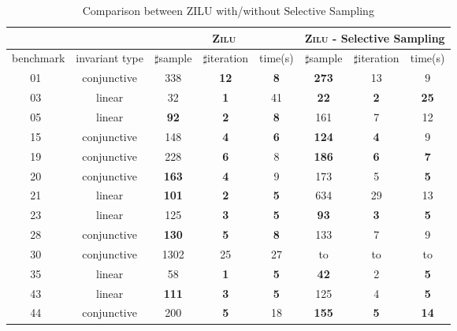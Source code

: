\begin{table}[t]
\centering
\caption{Comparison between ZILU with/without Selective Sampling}
\begin{tabular}{l c | c c c | c c c |}
\cline{3-8}
& &\multicolumn{3}{|c|}{\textsc{Zilu}}&\multicolumn{3}{c|}{\textsc{Zilu} - Selective Sampling}\\
\hline
\multicolumn{1}{|c|}{benchmark}&\multicolumn{1}{|c|}{invariant type}& $\sharp$sample & $\sharp$iteration & time(s) & $\sharp$sample & $\sharp$iteration &time(s) \\
\hline
\multicolumn{1}{|c|}{01~\cite{isil2013inductive}}				&conjunctive	&338  &\textbf{12}	&\textbf{8}	&\textbf{273}	&13	&9\\
\multicolumn{1}{|c|}{03~\cite{isil2013inductive}}				&linear			&32	&\textbf{1}	&41	&\textbf{22}	&\textbf{2}	&\textbf{25}\\
\multicolumn{1}{|c|}{05~\cite{isil2013inductive}}				&linear 		&\textbf{92}	&\textbf{2}	&\textbf{8}	&161	&7	&12\\
\multicolumn{1}{|c|}{15~\cite{isil2013inductive}}				&conjunctive	&148	&\textbf{4}	&\textbf{6}	&\textbf{124}	&\textbf{4}	&9\\
\multicolumn{1}{|c|}{19~\cite{isil2013inductive}}				&conjunctive	&228	&\textbf{6}	&8	&\textbf{186}	&\textbf{6}	&\textbf{7}\\
\multicolumn{1}{|c|}{20~\cite{isil2013inductive}}				&conjunctive	&\textbf{163}	&\textbf{4}	&9	&173	&5	&\textbf{5}\\
\multicolumn{1}{|c|}{21~\cite{isil2013inductive}}				&linear			&\textbf{101}	&\textbf{2}	&\textbf{5}	&634	&29	&13\\
\multicolumn{1}{|c|}{23~\cite{isil2013inductive}}				&linear			&125	&\textbf{3}	&\textbf{5}	&\textbf{93}	&\textbf{3}	&\textbf{5}\\
\multicolumn{1}{|c|}{28~\cite{isil2013inductive}}				&conjunctive	&\textbf{130}	&\textbf{5}	&\textbf{8}	     &133	&7	&9						\\
\multicolumn{1}{|c|}{30~\cite{isil2013inductive}}				&conjunctive	&1302	&25	&27&to	&to	&to\\
\multicolumn{1}{|c|}{35~\cite{isil2013inductive}}				&linear			&58	&\textbf{1}	&\textbf{5}	       &\textbf{42}	&2	&\textbf{5}		\\
\multicolumn{1}{|c|}{43~\cite{isil2013inductive}}				&linear			&\textbf{111}	&\textbf{3}	&\textbf{5}	   &125	&4	&\textbf{5}		\\
\multicolumn{1}{|c|}{44~\cite{isil2013inductive}}				&conjunctive	&200	&\textbf{5}	&18	&\textbf{155}	&\textbf{5}	&\textbf{14}\\

\end{tabular}
\end{table}
